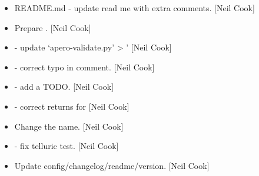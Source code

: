\documentclass[a4paper,10pt,english]{report}
\begin{document}
\begin{itemize}
\item {} 
README.md - update read me with extra comments. {[}Neil Cook{]}

\item {} 
Prepare . {[}Neil Cook{]}

\item {} 
 - update ‘apero-validate.py’
\textendash{}\textgreater{} ’ {[}Neil Cook{]}

\item {} 
 - correct typo in comment. {[}Neil
Cook{]}

\item {} 
 - add a TODO. {[}Neil Cook{]}

\item {} 
 - correct returns for
 {[}Neil Cook{]}

\item {} 
Change the  name. {[}Neil Cook{]}

\item {} 
 - fix telluric test. {[}Neil Cook{]}

\item {} 
Update config/changelog/readme/version. {[}Neil Cook{]}

\end{itemize}
\end{document}
